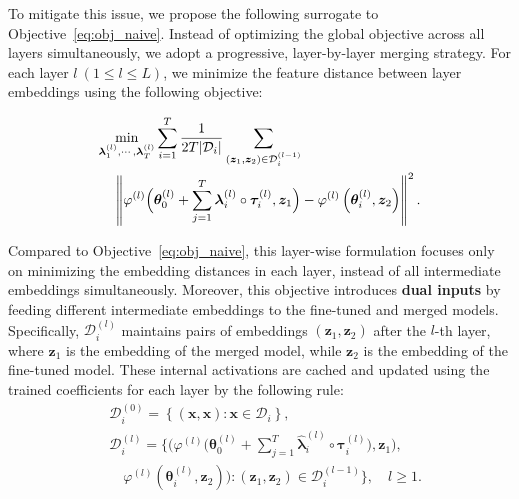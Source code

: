 To mitigate this issue, we propose the following surrogate to Objective~\ref{eq:obj_naive}.
Instead of optimizing the global objective across all layers simultaneously, we adopt a progressive, layer-by-layer merging strategy.
For each layer $l~(1\le l \le L)$, we minimize the feature distance between layer embeddings using the following objective:

{\small
\vspace{-20pt}
\begin{align}
    \min_{\boldsymbol{\lambda}_1^{(l)}, \cdots, \boldsymbol{\lambda}_T^{(l)}} & \sum_{i=1}^{T}\frac{1}{2T|\mathcal{D}_{i}|}\sum_{(\boldsymbol{z}_1, \boldsymbol{z}_2) \in \mathcal{D}_i^{(l-1)}}\nonumber\\
& \hspace{-30pt} \left\| \varphi^{(l)}\Big( \boldsymbol{\theta}_{0}^{(l)}+ \sum_{j=1}^{T}\boldsymbol{\lambda}_{i}^{(l)}\circ \boldsymbol{\tau}_{i}^{(l)}, \boldsymbol{z}_1 \Big) - \varphi^{(l)}\left( \boldsymbol{\theta}_{i}^{(l)}, \boldsymbol{z}_2 \right) \right\|^{2} .
\end{align}
\label{eq:obj}
}

Compared to Objective~\ref{eq:obj_naive}, this layer-wise formulation focuses only on minimizing the embedding distances in each layer, instead of all intermediate embeddings simultaneously. 
Moreover, this objective introduces \textbf{dual inputs} by feeding different intermediate embeddings to the fine-tuned and merged models. 
Specifically, $\mathcal{D}_{i}^{(l)}$ maintains pairs of embeddings $(\boldsymbol{z}_1, \boldsymbol{z}_2)$ after the $l$-th layer, where $\boldsymbol{z}_1$ is the embedding of
the merged model, while $\boldsymbol{z}_2$ is the embedding of the fine-tuned
model. These internal activations are cached and updated using the trained coefficients for each layer by the following rule:
\begin{align*}
     & \mathcal{D}_{i}^{(0)}= \left\{(\boldsymbol{x}, \boldsymbol{x}): \boldsymbol{x} \in \mathcal{D}_{i} \right\},                                                                            \\
     & \mathcal{D}_{i}^{(l)}= \Bigg\{ \Big( \varphi^{(l)}\Big( \boldsymbol{\theta}_{0}^{(l)}+ \sum_{j=1}^{T}\hat{\boldsymbol{\lambda}}_{i}^{(l)}\circ \boldsymbol{\tau}_{i}^{(l)}\Big), \boldsymbol{z}_1 \Big), \\
     & \quad \varphi^{(l)}\left( \boldsymbol{\theta}_{i}^{(l)}, \boldsymbol{z}_2 \right) \Big): (\boldsymbol{z}_1, \boldsymbol{z}_2) \in \mathcal{D}_{i}^{(l-1)}\Bigg\}, \quad l \ge 1.
\end{align*}

